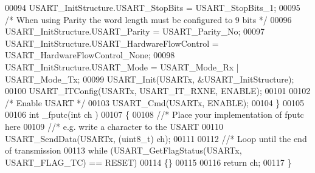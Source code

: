 \begin{DoxyCode}
00094   USART\_InitStructure.USART_StopBits = USART_StopBits_1;
00095   \textcolor{comment}{/* When using Parity the word length must be configured to 9 bits */}
00096   USART\_InitStructure.USART_Parity = USART_Parity_No;
00097   USART\_InitStructure.USART_HardwareFlowControl = 
      USART_HardwareFlowControl_None;
00098   USART\_InitStructure.USART_Mode = USART_Mode_Rx | USART_Mode_Tx;
00099   USART_Init(USARTx, &USART\_InitStructure);
00100   USART_ITConfig(USARTx, USART_IT_RXNE, ENABLE);
00101 
00102   \textcolor{comment}{/* Enable USART */}
00103   USART_Cmd(USARTx, ENABLE);
00104 \}
00105 
00106 \textcolor{keywordtype}{int} _fputc(\textcolor{keywordtype}{int} ch )
00107 \{
00108   \textcolor{comment}{//* Place your implementation of fputc here }
00109   \textcolor{comment}{//* e.g. write a character to the USART }
00110   USART_SendData(USARTx, (uint8\_t) ch);
00111 
00112   \textcolor{comment}{//* Loop until the end of transmission }
00113   \textcolor{keywordflow}{while} (USART_GetFlagStatus(USARTx, USART_FLAG_TC) == RESET)
00114   \{\}
00115 
00116   \textcolor{keywordflow}{return} ch;
00117 \}
\end{DoxyCode}
